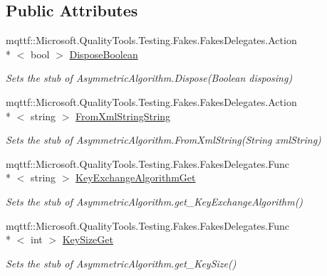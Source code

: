 \subsection*{Public Attributes}
\begin{DoxyCompactItemize}
\item 
mqttf\-::\-Microsoft.\-Quality\-Tools.\-Testing.\-Fakes.\-Fakes\-Delegates.\-Action\\*
$<$ bool $>$ \hyperlink{class_system_1_1_security_1_1_cryptography_1_1_fakes_1_1_stub_asymmetric_algorithm_a93df443ec4ef8fbbc37e56cf7587bb37}{Dispose\-Boolean}
\begin{DoxyCompactList}\small\item\em Sets the stub of Asymmetric\-Algorithm.\-Dispose(\-Boolean disposing)\end{DoxyCompactList}\item 
mqttf\-::\-Microsoft.\-Quality\-Tools.\-Testing.\-Fakes.\-Fakes\-Delegates.\-Action\\*
$<$ string $>$ \hyperlink{class_system_1_1_security_1_1_cryptography_1_1_fakes_1_1_stub_asymmetric_algorithm_a242733167ef69ad81660273c153d9f6b}{From\-Xml\-String\-String}
\begin{DoxyCompactList}\small\item\em Sets the stub of Asymmetric\-Algorithm.\-From\-Xml\-String(\-String xml\-String)\end{DoxyCompactList}\item 
mqttf\-::\-Microsoft.\-Quality\-Tools.\-Testing.\-Fakes.\-Fakes\-Delegates.\-Func\\*
$<$ string $>$ \hyperlink{class_system_1_1_security_1_1_cryptography_1_1_fakes_1_1_stub_asymmetric_algorithm_af40f692f430f6d5a1980ff47b32e7109}{Key\-Exchange\-Algorithm\-Get}
\begin{DoxyCompactList}\small\item\em Sets the stub of Asymmetric\-Algorithm.\-get\-\_\-\-Key\-Exchange\-Algorithm()\end{DoxyCompactList}\item 
mqttf\-::\-Microsoft.\-Quality\-Tools.\-Testing.\-Fakes.\-Fakes\-Delegates.\-Func\\*
$<$ int $>$ \hyperlink{class_system_1_1_security_1_1_cryptography_1_1_fakes_1_1_stub_asymmetric_algorithm_a015036b894984c161102bb047fab06ff}{Key\-Size\-Get}
\begin{DoxyCompactList}\small\item\em Sets the stub of Asymmetric\-Algorithm.\-get\-\_\-\-Key\-Size()\end{DoxyCompactList}\item 

\end{DoxyCompactItemize}
